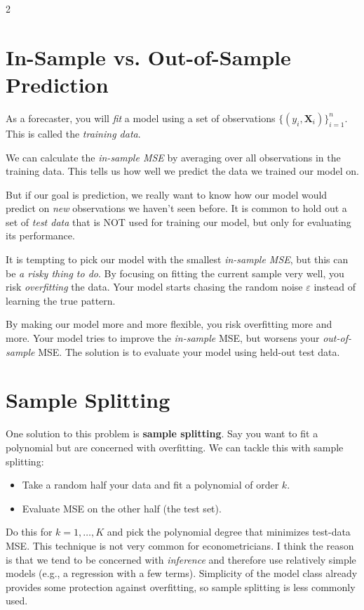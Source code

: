 \documentclass[12pt]{article}
\begin{document}
\begin{multicols}{2}
  \section*{In-Sample vs. Out-of-Sample Prediction}

  As a forecaster, you will \emph{fit} a model using a set of observations $\{ (y_i, \bm{X}_i) \}_{i=1}^n$. This is called the \emph{training data}.

  We can calculate the \emph{in-sample MSE} by averaging over all observations in the training data. This tells us how well we predict the data we trained our model on.

  But if our goal is prediction, we really want to know how our model would predict on \emph{new} observations we haven't seen before.
  It is common to hold out a set of \emph{test data} that is NOT used for training our model, but only for evaluating its performance.

  It is tempting to pick our model with the smallest \emph{in-sample MSE}, but this can be \emph{a risky thing to do}.
  By focusing on fitting the current sample very well, you risk \emph{overfitting} the data.
  Your model starts chasing the random noise $\varepsilon$ instead of learning the true pattern.

  By making our model more and more flexible, you risk overfitting more and more.
  Your model tries to improve the \emph{in-sample} MSE, but worsens your \emph{out-of-sample} MSE.
  The solution is to evaluate your model using held-out test data.

  \section*{Sample Splitting}

  One solution to this problem is \textbf{sample splitting}.
  Say you want to fit a polynomial but are concerned with overfitting.
  We can tackle this with sample splitting:
  \begin{itemize}
    \item Take a random half your data and fit a polynomial of order $k$.
    \item Evaluate MSE on the other half (the test set).
  \end{itemize}

  Do this for $k = 1, \dots, K$ and pick the polynomial degree that minimizes test-data MSE.
  This technique is not very common for econometricians.
  I think the reason is that we tend to be concerned with \emph{inference} and therefore use relatively simple models (e.g., a regression with a few terms).
  Simplicity of the model class already provides some protection against overfitting, so sample splitting is less commonly used.


\end{multicols}
\end{document}
